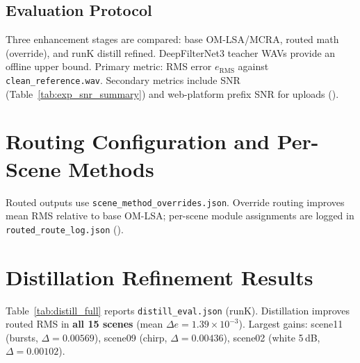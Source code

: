 \subsection{Evaluation Protocol}

Three enhancement stages are compared: base OM-LSA/MCRA, routed math (override), and runK distill refined. DeepFilterNet3 teacher WAVs provide an offline upper bound. Primary metric: RMS error $e_{\mathrm{RMS}}$ against \texttt{clean\_reference.wav}. Secondary metrics include SNR (Table~\ref{tab:exp_snr_summary}) and web-platform prefix SNR for uploads ().

\section{Routing Configuration and Per-Scene Methods}
\label{sec:exp_routing}

Routed outputs use \texttt{scene\_method\_overrides.json}. Override routing improves mean RMS relative to base OM-LSA; per-scene module assignments are logged in \texttt{routed\_route\_log.json} ().

\section{Distillation Refinement Results}
\label{sec:distill_results}

Table~\ref{tab:distill_full} reports \texttt{distill\_eval.json} (runK). Distillation improves routed RMS in \textbf{all 15 scenes} (mean $\Delta e=1.39\times10^{-3}$). Largest gains: scene11 (bursts, $\Delta=0.00569$), scene09 (chirp, $\Delta=0.00436$), scene02 (white 5\,dB, $\Delta=0.00102$).

